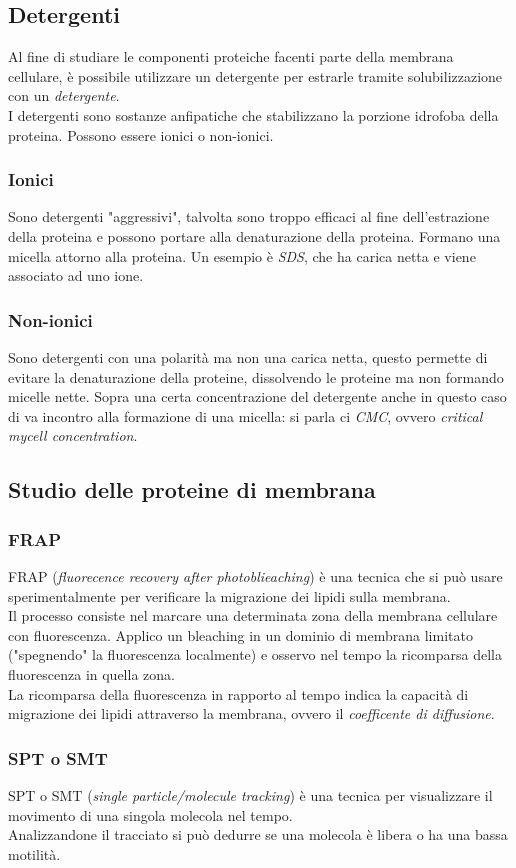     \subsection{Detergenti}
        Al fine di studiare le componenti proteiche facenti parte della membrana cellulare, è possibile utilizzare un detergente per estrarle tramite solubilizzazione con un \textit{detergente}.\\
        I detergenti sono sostanze anfipatiche che stabilizzano la porzione idrofoba della proteina. Possono essere ionici o non-ionici.
        \subsubsection{Ionici}
            Sono detergenti "aggressivi", talvolta sono troppo efficaci al fine dell'estrazione della proteina e possono portare alla denaturazione della proteina. Formano una micella attorno alla proteina. Un esempio è \textit{SDS}, che ha carica netta e viene associato ad uno ione.
        \subsubsection{Non-ionici}
            Sono detergenti con una polarità ma non una carica netta, questo permette di evitare la denaturazione della proteine, dissolvendo le proteine ma non formando micelle nette. 
            Sopra una certa concentrazione del detergente anche in questo caso di va incontro alla formazione di una micella: si parla ci \textit{CMC}, ovvero \textit{critical mycell concentration}.
        
    \subsection{Studio delle proteine di membrana}
        \subsubsection{FRAP}
            FRAP (\textit{fluorecence recovery after photoblieaching}) è una tecnica che si può usare sperimentalmente per verificare la migrazione dei lipidi sulla membrana. \\
            Il processo consiste nel marcare una determinata zona della membrana cellulare con fluorescenza. Applico un bleaching in un dominio di membrana limitato ("spegnendo" la fluorescenza localmente) e osservo nel tempo la ricomparsa della fluorescenza in quella zona.\\
            La ricomparsa della fluorescenza in rapporto al tempo indica la capacità di migrazione dei lipidi attraverso la membrana, ovvero il \textit{coefficente di diffusione}.
        \subsubsection{SPT o SMT}
            SPT o SMT (\textit{single particle/molecule tracking}) è una tecnica per visualizzare il movimento di una singola molecola nel tempo.\\
            Analizzandone il tracciato si può dedurre se una molecola è libera o ha una bassa motilità.
        
\pagebreak